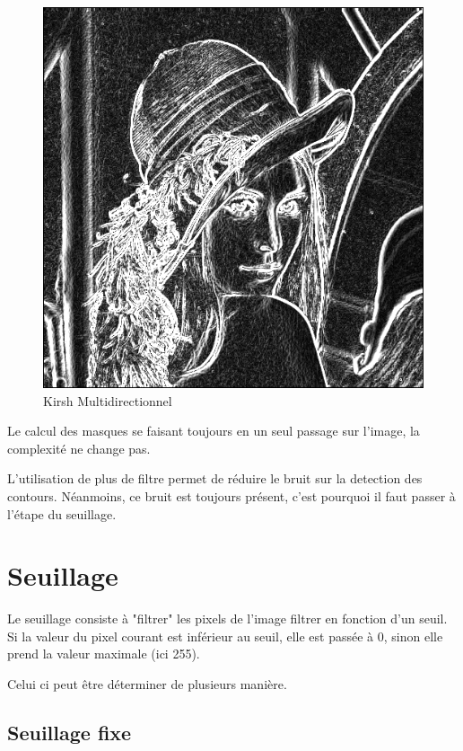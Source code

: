 \documentclass[11pt]{article}
\begin{document}
	\begin{figure}[H]
		\centering
		\includegraphics[scale=0.25]{Image/filtreKirshMultidirectionnel.png}
		\caption{Kirsh Multidirectionnel}
		\label{fig:KirshMultidirectionnel}
	\end{figure}

	Le calcul des masques se faisant toujours en un seul passage sur l'image, la complexité ne change pas.

	L'utilisation de plus de filtre permet de réduire le bruit sur la detection des contours. 
	Néanmoins, ce bruit est toujours présent, c'est pourquoi il faut passer à l'étape du seuillage.
 
\section{Seuillage}
	
	Le seuillage consiste à "filtrer" les pixels de l'image filtrer en fonction d'un seuil. 
	Si la valeur du pixel courant est inférieur au seuil, elle est passée à 0, sinon elle prend la valeur maximale (ici 255).

	Celui ci peut être déterminer de plusieurs manière.

	\subsection{Seuillage fixe}\label{fixe}
\end{document}
